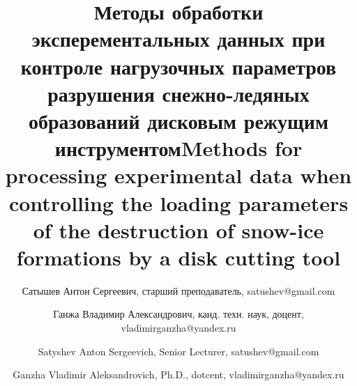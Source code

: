 \newcommand{\mainAuthor}{Сатышев Антон Сергеевич}
\newcommand{\mainAuthorEN}{Satyshev Anton Sergeevich}
\newcommand{\articleTitle}{Методы обработки эксперементальных данных при контроле нагрузочных параметров разрушения снежно-ледяных образований дисковым режущим инструментом}
\newcommand{\articleTitleEN}{Methods for processing experimental data when controlling the loading parameters of the destruction of snow-ice formations by a disk cutting tool}
\newcommand{\keywords}{снежно-ледяные образования, дисковый режущий инструмент, силовые параметры, радиус закругления, лёд, радиус закругления рабой кромки}
\newcommand{\keywordsEN}{snow-ice formations, disk cutting tool, forse parametrs, PSIF, ice, radius of curvature of the working edge}


\author{\mainAuthor, старший преподаватель, satushev@gmail.com}
\author{Ганжа Владимир Александрович, канд. техн. наук, доцент, vladimirganzha@yandex.ru}

\author{\mainAuthorEN, Senior Lecturer, satushev@gmail.com}
\author{Ganzha Vladimir Aleksandrovich, Ph.D., dotcent, vladimirganzha@yandex.ru}

\title{\articleTitle \newline \newline \articleTitleEN}
\date{}